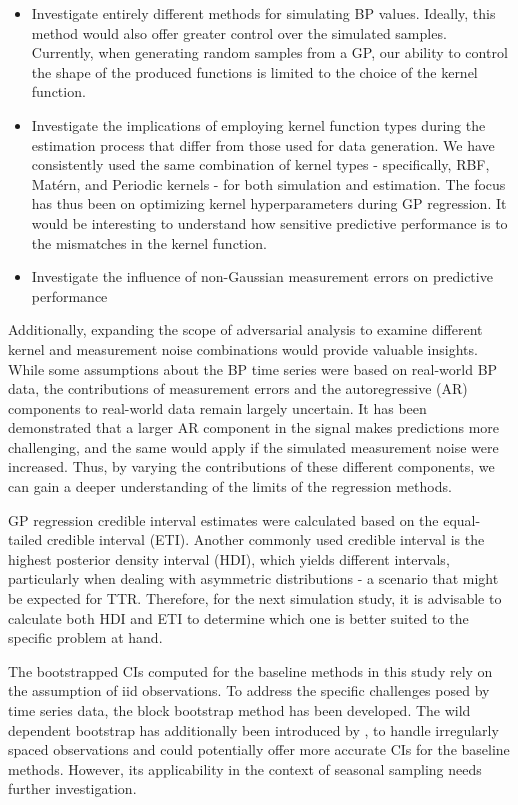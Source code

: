 \begin{itemize}
    \item Investigate entirely different methods for simulating BP values.
    Ideally, this method would also offer greater control over the simulated samples.
    Currently, when generating random samples from a GP, our ability to control the shape of the produced
    functions is limited to the choice of the kernel function.
    \item Investigate the implications of employing kernel function types
    during the estimation process that differ from those used for data generation.
    We have consistently used the same combination of kernel types - specifically, RBF, Matérn, and Periodic kernels -
    for both simulation and estimation.
    The focus has thus been on optimizing kernel hyperparameters during GP regression.
    It would be interesting to understand how sensitive predictive performance is to the mismatches in
    the kernel function.
    \item Investigate the influence
    of non-Gaussian measurement errors on predictive performance
\end{itemize}

Additionally, expanding the scope of adversarial analysis to examine different
kernel and measurement noise combinations would provide valuable insights.
While some assumptions about the BP time series were based on real-world BP data,
the contributions of measurement errors and the autoregressive (AR) components
to real-world data remain largely uncertain.
It has been demonstrated that a larger AR component in the signal makes predictions
more challenging, and the same would apply if the simulated measurement noise were increased.
Thus, by varying the contributions of these different components,
we can gain a deeper understanding of the limits of the regression methods.

GP regression credible interval estimates were calculated based on the equal-tailed
credible interval (ETI). Another commonly used credible interval is
the highest posterior density interval (HDI), which yields different intervals,
particularly when dealing with asymmetric distributions - a scenario that might be expected for TTR.
Therefore, for the next simulation study, it is advisable to calculate both HDI and ETI
to determine which one is better suited to the specific problem at hand.

The bootstrapped CIs computed for the baseline methods in this study rely on
the assumption of iid observations.
To address the specific challenges
posed by time series data, the block bootstrap method has been developed.
The wild dependent
bootstrap has additionally been introduced by \citeauthor{shao_dependent_2010},
to handle irregularly spaced observations and could potentially offer
more accurate CIs for the baseline methods.
However, its applicability in the context of seasonal sampling needs
further investigation.

